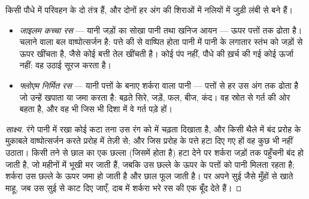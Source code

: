 \begin{proposition}[दो रस]\label{prop:g12:plant-rooted-life:saps}
किसी पौधे में परिवहन के दो तंत्र हैं, और दोनों हर अंग की शिराओं में नलियों
में जुड़ी लंबी  से बने हैं।
\begin{itemize}
  \item \emph{जाइलम} \emph{कच्चा रस} --- यानी जड़ों का सोखा
        पानी तथा खनिज आयन --- ऊपर पत्तों तक ढोता है। चलाने वाला बल
        वाष्पोत्सर्जन है: पत्ते की  से वाष्पित होता पानी  में
        पानी के लगातार स्तंभ को जड़ों से ऊपर खींचता है, जैसे कोई बत्ती तेल
        खींचती है। कोई पंप नहीं, पौधे की ख़र्च की गई कोई ऊर्जा नहीं: वह
        उठाई सूरज करता है।
  \item \emph{फ्लोएम} \emph{निर्मित रस} --- यानी पत्तों के
        बनाए शर्करा वाला पानी --- पत्तों से हर उस अंग तक ढोता है जो उन्हें
        खपाता या जमा करता है: बढ़ते सिरे, जड़ें, फल, बीज, कंद। वह स्रोत से
        गर्त की ओर बहता है, और वह भी जिस भी दिशा में वे गर्त पड़े हों।
\end{itemize}
\end{proposition}
\begin{proof}[साक्ष्य]
रंगे पानी में रखा कोई कटा तना उस रंग को  में चढ़ता दिखाता है, और किसी
थैले में बंद प्ररोह के मुक़ाबले वाष्पोत्सर्जन करते प्ररोह में तेज़ी से; और
जिस प्ररोह के पत्ते हटा दिए गए हों वह कुछ भी नहीं उठाता। किसी तने से छाल का
एक छल्ला (जिसमें  होता है) हटा देने पर शर्करा जड़ों तक पहुँचनी बंद हो
जाती है, जो महीनों में भूखी मर जाती हैं, जबकि उस छल्ले के ऊपर के पत्तों को
पानी मिलता रहता है; शर्करा उस छल्ले के ऊपर जमा हो जाती है और छाल फूल जाती
है।  पर अपने सुई जैसे मुँहों से खाते माहू, जब उस सुई से काट दिए जाएँ,
दाब में शर्करा भरे रस की एक बूँद देते हैं।
\end{proof}

